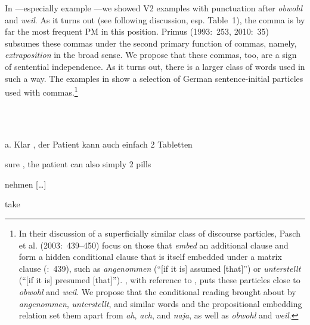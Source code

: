 \begin{styleMoutonTextBeforeExample}
In —especially example —we showed V2 examples with punctuation after \textit{obwohl} and \textit{weil}. As it turns out (see following discussion, esp. Table~1), the comma is by far the most frequent PM in this position. Primus (1993:~253, 2010:~35) subsumes these commas under the second primary function of commas, namely, \textit{extraposition} in the broad sense. We propose that these commas, too, are a sign of sentential independence. As it turns out, there is a larger class of words used in such a way. The examples in  show a selection of German sentence-initial particles used with commas.\footnote{In their discussion of a superficially similar class of discourse particles, Pasch et al. (2003:~439–450) focus on those that \textit{embed} an additional clause and form a hidden conditional clause that is itself embedded under a matrix clause (\citealt{PaschEtAl2003}:~439), such as \textit{angenommen} (“[if it is] assumed [that]”) or \textit{unterstellt} (“[if it is] presumed [that]”). \citet[327]{Freywald2016}, with reference to \citet{PaschEtAl2003}, puts these particles close to \textit{obwohl} and \textit{weil}. We propose that the conditional reading brought about by \textit{angenommen}, \textit{unterstellt}, and similar words and the propositional embedding relation set them apart from \textit{ah}, \textit{ach}, and \textit{naja}, as well as \textit{obwohl} and \textit{weil}.}
\end{styleMoutonTextBeforeExample}

\begin{styleMoutonExample}
\ea%
    \label{ex:key:9}
    \gll\\
        \\
    \glt
    \z

          a.  Klar  ,  der  Patient  kann  auch  einfach  2  Tabletten
\end{styleMoutonExample}

\begin{styleMoutonExampleAlphaGloss}
sure  ,  the  patient  can  also  simply  2  pills
\end{styleMoutonExampleAlphaGloss}

\begin{styleMoutonExampleAlphaGloss}
nehmen […]
\end{styleMoutonExampleAlphaGloss}

\begin{styleMoutonExampleAlphaGloss}
take
\end{styleMoutonExampleAlphaGloss}

